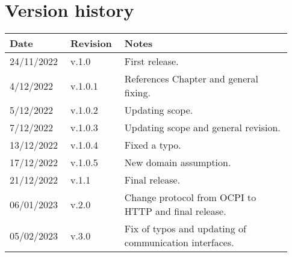 \chapter*{Version history}

\begin{center}
	\begin{tabular}{@{}p{0.18\linewidth} p{0.18\linewidth} p{0.57\linewidth}@{}}
		\toprule
		\textbf{Date} & \textbf{Revision} & \textbf{Notes}\\
		\midrule
		24/11/2022 & v.1.0 & First release.\\
		 4/12/2022 & v.1.0.1 & References Chapter and general fixing.\\
		 5/12/2022 & v.1.0.2 & Updating scope.\\
            7/12/2022 & v.1.0.3 & Updating scope and general revision.\\
            13/12/2022 & v.1.0.4 & Fixed a typo.\\
            17/12/2022 & v.1.0.5 & New domain assumption.\\
            21/12/2022 & v.1.1 & Final release.\\
            06/01/2023 & v.2.0 & Change protocol from OCPI to HTTP and final release.\\
            05/02/2023 & v.3.0 & Fix of typos and updating of communication interfaces.\\
		\bottomrule
	\end{tabular}
\end{center}